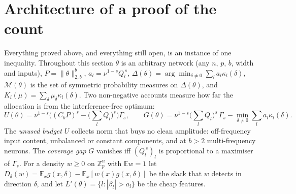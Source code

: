 \documentclass[11pt]{article}
\theoremstyle{definition}
\begin{document}
\section{Architecture of a proof of the count}\label{sec:arch}
Everything proved above, and everything still open, is an instance of one inequality.  Throughout this section $\theta$ is an
arbitrary network (any $n$, $p$, $b$, width and inputs), $P=\|\theta\|_{2,b}^b$, $a_l=\nu^{1-s}Q_l^{\,s}$,
$\Delta(\theta)=\arg\min_{\delta\ne0}\sum_la_l\kappa_l(\delta)$, $\mathcal M(\theta)$ is the set of symmetric probability measures on
$\Delta(\theta)$, and $K_l(\mu)=\sum_\delta\mu_\delta\kappa_l(\delta)$.  Two non-negative accounts measure how far the allocation is
from the interference-free optimum:
\[U(\theta)=\nu^{1-s}\Big((C_bP)^s-\big(\textstyle\sum_lQ_l\big)^s\Big)\Gamma_s,\qquad
G(\theta)=\nu^{1-s}\big(\textstyle\sum_lQ_l\big)^s\,\Gamma_s-\min_{\delta\ne0}\sum_la_l\kappa_l(\delta).\]
The \emph{unused budget} $U$ collects norm that buys no clean amplitude: off-frequency input content, unbalanced or constant
components, and at $b>2$ multi-frequency neurons.  The \emph{coverage gap} $G$ vanishes iff $(Q_l^{\,s})_l$ is proportional to a
maximiser of $\Gamma_s$.  For a density $w\ge0$ on $\mathbb Z_p^n$ with $\mathbb Ew=1$ let
$D_\delta(w)=\mathbb E_xg(x,\delta)-\mathbb E_x[w(x)g(x,\delta)]$ be the slack that $w$ detects in direction $\delta$, and let
$L'(\theta)=\{l:|\beta_l|>a_l\}$ be the cheap features.
\end{document}
